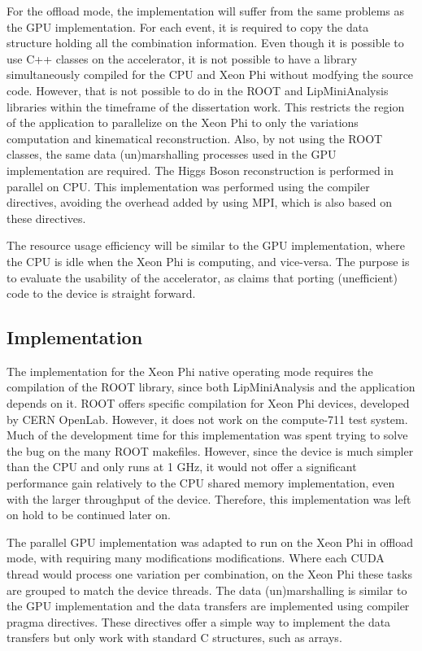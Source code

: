 For the offload mode, the implementation will suffer from the same problems as the GPU implementation. For each event, it is required to copy the data structure holding all the combination information. Even though it is possible to use C++ classes on the accelerator, it is not possible to have a library simultaneously compiled for the CPU and Xeon Phi without modfying the source code. However, that is not possible to do in the ROOT and LipMiniAnalysis libraries within the timeframe of the dissertation work. This restricts the region of the application to parallelize on the Xeon Phi to only the variations computation and kinematical reconstruction. Also, by not using the ROOT classes, the same data (un)marshalling processes used in the GPU implementation are required. The Higgs Boson reconstruction is performed in parallel on CPU. This implementation was performed using the \intel compiler directives, avoiding the overhead added by using MPI, which is also based on these directives.

The resource usage efficiency will be similar to the GPU implementation, where the CPU is idle when the Xeon Phi is computing, and vice-versa. The purpose is to evaluate the usability of the accelerator, as \intel claims that porting (unefficient) code to the device is straight forward.

\subsection{Implementation}
\label{MICImplementation}

The implementation for the Xeon Phi native operating mode requires the compilation of the ROOT library, since both LipMiniAnalysis and the application depends on it. ROOT offers specific compilation for \intel Xeon Phi devices, developed by CERN OpenLab. However, it does not work on the compute-711 test system. Much of the development time for this implementation was spent trying to solve the bug on the many ROOT makefiles. However, since the device is much simpler than the CPU and only runs at 1 GHz, it would not offer a significant performance gain relatively to the CPU shared memory implementation, even with the larger throughput of the device. Therefore, this implementation was left on hold to be continued later on.

The parallel GPU implementation was adapted to run on the Xeon Phi in offload mode, with requiring many modifications modifications. Where each CUDA thread would process one variation per combination, on the Xeon Phi these tasks are grouped to match the device threads. The data (un)marshalling is similar to the GPU implementation and the data transfers are implemented using compiler pragma directives. These directives offer a simple way to implement the data transfers but only work with standard C structures, such as arrays.

